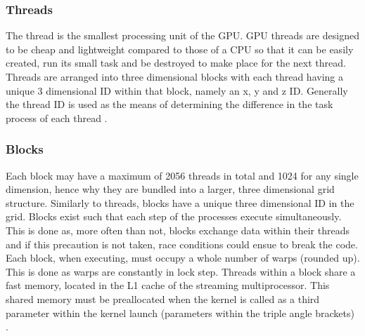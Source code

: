 \subsubsection{Threads}\label{gpu:ssec:thread}
The thread is the smallest processing unit of the GPU. GPU threads are designed to be cheap and lightweight compared to those of a CPU so that it can be easily created, run its small task and be destroyed to make place for the next thread. Threads are arranged into three dimensional blocks with each thread having a unique 3 dimensional ID within that block, namely an x, y and z ID. Generally the thread ID is used as the means of determining the difference in the task process of each thread \citep{CUDA}.
%
\subsubsection{Blocks}\label{gpu:ssec:block}
Each block may have a maximum of 2056 threads in total and 1024 for any single dimension, hence why they are bundled into a larger, three dimensional grid structure. Similarly to threads, blocks have a unique three dimensional ID in the grid. Blocks exist such that each step of the processes execute simultaneously. This is done as, more often than not, blocks exchange data within their threads and if this precaution is not taken, race conditions could ensue to break the code. Each block, when executing, must occupy a whole number of warps (rounded up). This is done as warps are constantly in lock step. Threads within a block share a fast memory, located in the L1 cache of the streaming multiprocessor. This shared memory must be preallocated when the kernel is called as a third parameter within the kernel launch (parameters within the triple angle brackets) \citep{CUDA}.
%
